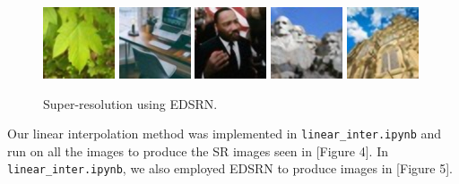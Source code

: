 \documentclass[letterpaper,12pt]{article}
\begin{document}
\begin{figure}[h!]
    \includegraphics[width=.2\textwidth]{opencv_/green-maple-leaf.jpg}\hfill
    \includegraphics[width=.2\textwidth]{opencv_/home-office.jpg}\hfill
    \includegraphics[width=.2\textwidth]{opencv_/martin-luther-king.jpg}\hfill
    \includegraphics[width=.2\textwidth]{opencv_/mount-rushmore.jpg}\hfill
    \includegraphics[width=.2\textwidth]{opencv_/salisbury-cathedral.jpg}
    \caption{Super-resolution using EDSRN.}
\end{figure}

Our linear interpolation method was implemented in \texttt{linear\_inter.ipynb} and run on all the images to produce the SR images seen in [Figure 4]. In \texttt{linear\_inter.ipynb}, we also employed EDSRN to produce images in [Figure 5]. \\
\end{document}
